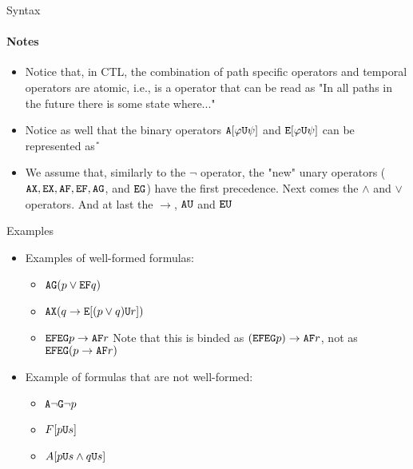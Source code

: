 \begin{frame}{Syntax}
	\framesubtitle{Notes}
	\begin{itemize}
		\item 
		{
			Notice that, in CTL, the combination of path specific operators and temporal operators are atomic, i.e., \A\F \; is a operator that can be read as "In all paths in the future there is some state where..."
		}
		
		\item 
		{
			Notice as well that the binary operators $\texttt{A}[\varphi\texttt{U}\psi]$ and $\texttt{E}[\varphi\texttt{U}\psi]$ can be represented as \A\U
		}
		
		\item 
		{
			We assume that, similarly to the $\neg$ operator, the "new" unary operators ($\texttt{A}\texttt{X}, \texttt{E}\texttt{X}, \texttt{A}\texttt{F}, \texttt{E}\texttt{F}, \texttt{A}\texttt{G} $, and $ \texttt{E}\texttt{G} $) have the first precedence. Next comes the $\land$ and $\lor$ operators. And at last the $\to$, $\texttt{A}\texttt{U}$ and $\texttt{E}\texttt{U}$
		}
	\end{itemize}
	
\end{frame}

\begin{frame}{Examples}
	\begin{itemize}
		\item
		{
			Examples of well-formed formulas:
			\begin{itemize}
				\item $\texttt{A}\texttt{G} (p \lor \texttt{E}\texttt{F} q)$ \pause
				\item $\texttt{A}\texttt{X} (q \to \texttt{E}[(p\lor q) \texttt{U} r])$ \pause
				\item $\texttt{E}\texttt{F}\texttt{E}\texttt{G} p \to \texttt{A}\texttt{F} r$ Note that this is binded as $(\texttt{E}\texttt{F}\texttt{E}\texttt{G} p) \to \texttt{A}\texttt{F} r$, not as $\texttt{E}\texttt{F}\texttt{E}\texttt{G} (p \to \texttt{A}\texttt{F} r)$
			\end{itemize}
			\pause
		}
		\item
		{
			Example of formulas that are not well-formed:
			\begin{itemize}
				\item $\texttt{A}\neg\texttt{G} \neg p$ \pause
				\item $F[p\texttt{U} s]$ \pause
				\item $A[p\texttt{U} s \land q \texttt{U} s]$
			\end{itemize}
		}
	\end{itemize}
\end{frame}

